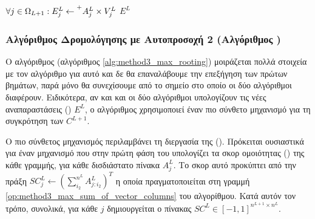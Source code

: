 {\begin{algorithm}[H]
\begin{algorithmic}[1]
      
    \State $\forall j \in \Omega_{L+1}: E^L_j \gets \prescript{+}{}{A_j^L} \times V_j^L$  \label{op:method3_sum_weighted_sum} %
    \State \Return $E^L$ 
    \EndProcedure

  \end{algorithmic}
  \end{algorithm}
}

\subsubsection{Αλγόριθμος Δρομολόγησης με Αυτο\textendash προσοχή 2 (Αλγόριθμος )}
Ο αλγόριθμος  (αλγόριθμος \ref{alg:method3_max_rooting}) μοιράζεται πολλά στοιχεία με τον αλγόριθμο  για αυτό και δε θα επαναλάβουμε την επεξήγηση των πρώτων βημάτων, παρά μόνο θα συνεχίσουμε από το σημείο στο οποίο οι δύο αλγόριθμοι διαφέρουν. Ειδικότερα, αν και και οι δύο αλγόριθμοι υπολογίζουν τις νέες αναπαραστάσεις () $E^L$, ο αλγόριθμος  χρησιμοποιεί έναν πιο σύνθετο μηχανισμό για τη συγκρότηση των $C^{L+1}$.\par

Ο πιο σύνθετος μηχανισμός περιλαμβάνει τη διεργασία της  (). Πρόκειται ουσιαστικά για έναν μηχανισμό που στην πρώτη φάση του υπολογίζει τα σκορ ομοιότητας () της κάθε γραμμής, για κάθε δισδιάστατο πίνακα $A_j^L$. Το σκορ αυτό προκύπτει από την πράξη $SC_j^L \gets (\sum_{i_2}^{n^L} A^L_{j:i_2})^T$ η οποία πραγματοποιείται στη γραμμή \ref{op:method3_max_sum_of_vector_columns} του αλγορίθμου. Κατά αυτόν τον τρόπο, συνολικά, για κάθε $j$ δημιουργείται ο πίνακας $SC^L \in [-1, 1]^{n^{L+1}\times n^L}$.\par


